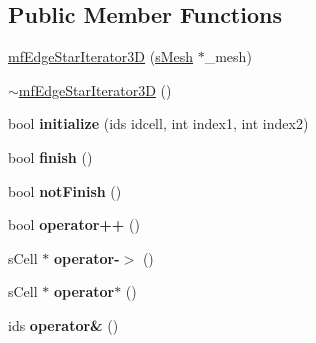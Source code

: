\subsection*{Public Member Functions}
\begin{DoxyCompactItemize}
\item 
\hyperlink{classmf_1_1mfEdgeStarIterator3D_a9dc421576d690d367e42900b5ace8e86}{mfEdgeStarIterator3D} (\hyperlink{classmf_1_1mfEdgeStarIterator3D_a875ac7316bdc779e38b0a8befde57366}{sMesh} $\ast$\_\-mesh)
\item 
\hyperlink{classmf_1_1mfEdgeStarIterator3D_a51c3e5a707ab22d500f785177c60beab}{$\sim$mfEdgeStarIterator3D} ()
\item 
\hypertarget{classmf_1_1mfEdgeStarIterator3D_aca589c444d58332ee236be5b73bc30ba}{
bool {\bfseries initialize} (ids idcell, int index1, int index2)}
\label{classmf_1_1mfEdgeStarIterator3D_aca589c444d58332ee236be5b73bc30ba}

\item 
\hypertarget{classmf_1_1mfEdgeStarIterator3D_af1bce3b4e18b794cfa6ed8a202f018a5}{
bool {\bfseries finish} ()}
\label{classmf_1_1mfEdgeStarIterator3D_af1bce3b4e18b794cfa6ed8a202f018a5}

\item 
\hypertarget{classmf_1_1mfEdgeStarIterator3D_a5c6a91a3e100b9f3b7f2908496240e97}{
bool {\bfseries notFinish} ()}
\label{classmf_1_1mfEdgeStarIterator3D_a5c6a91a3e100b9f3b7f2908496240e97}

\item 
\hypertarget{classmf_1_1mfEdgeStarIterator3D_a87f4b136dd0acf703a75dbf0744f029b}{
bool {\bfseries operator++} ()}
\label{classmf_1_1mfEdgeStarIterator3D_a87f4b136dd0acf703a75dbf0744f029b}

\item 
\hypertarget{classmf_1_1mfEdgeStarIterator3D_aaa92619beac64e3a04efeaf8140a5996}{
sCell $\ast$ {\bfseries operator-\/$>$} ()}
\label{classmf_1_1mfEdgeStarIterator3D_aaa92619beac64e3a04efeaf8140a5996}

\item 
\hypertarget{classmf_1_1mfEdgeStarIterator3D_ad2f8ffb9066b075f6b11b6c62bf05911}{
sCell $\ast$ {\bfseries operator$\ast$} ()}
\label{classmf_1_1mfEdgeStarIterator3D_ad2f8ffb9066b075f6b11b6c62bf05911}

\item 
\hypertarget{classmf_1_1mfEdgeStarIterator3D_ad9a32e1ed5a6d63f07c5fe2d6dea6f8b}{
ids {\bfseries operator\&} ()}
\label{classmf_1_1mfEdgeStarIterator3D_ad9a32e1ed5a6d63f07c5fe2d6dea6f8b}

\end{DoxyCompactItemize}
